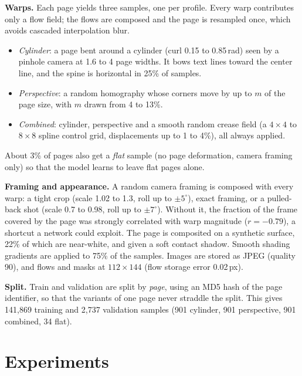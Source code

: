 \documentclass[a4paper,fleqn]{cas-sc}
\begin{document}
\textbf{Warps.} Each page yields three samples, one per profile. Every warp contributes only a flow field; the flows are composed and the page is resampled once, which avoids cascaded interpolation blur.
\begin{itemize}
\item \emph{Cylinder}: a page bent around a cylinder (curl 0.15 to 0.85\,rad) seen by a pinhole camera at 1.6 to 4 page widths. It bows text lines toward the center line, and the spine is horizontal in 25\% of samples.
\item \emph{Perspective}: a random homography whose corners move by up to $m$ of the page size, with $m$ drawn from 4 to 13\%.
\item \emph{Combined}: cylinder, perspective and a smooth random crease field (a $4\times4$ to $8\times8$ spline control grid, displacements up to 1 to 4\%), all always applied.
\end{itemize}
About 3\% of pages also get a \emph{flat} sample (no page deformation, camera framing only) so that the model learns to leave flat pages alone.

\textbf{Framing and appearance.} A random camera framing is composed with every warp: a tight crop (scale 1.02 to 1.3, roll up to $\pm5^\circ$), exact framing, or a pulled-back shot (scale 0.7 to 0.98, roll up to $\pm7^\circ$). Without it, the fraction of the frame covered by the page was strongly correlated with warp magnitude ($r=-0.79$), a shortcut a network could exploit. The page is composited on a synthetic surface, 22\% of which are near-white, and given a soft contact shadow. Smooth shading gradients are applied to 75\% of the samples. Images are stored as JPEG (quality 90), and flows and masks at $112\times144$ (flow storage error 0.02\,px).

\textbf{Split.} Train and validation are split by \emph{page}, using an MD5 hash of the page identifier, so that the variants of one page never straddle the split. This gives 141{,}869 training and 2{,}737 validation samples (901 cylinder, 901 perspective, 901 combined, 34 flat).

\section{Experiments}
\label{sec:exp}
\end{document}

